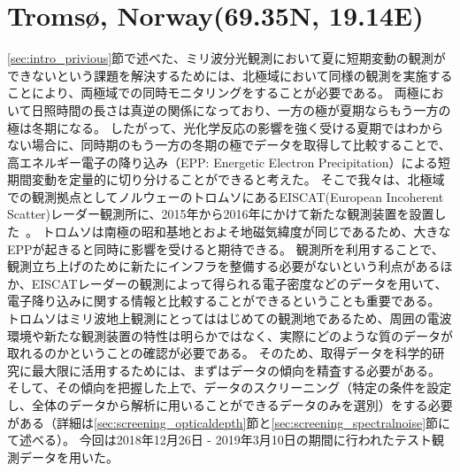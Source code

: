 \section{Troms\o , Norway(69.35\textdegree N, 19.14\textdegree E)}
\label{sec:mm_tromsoe}
\ref{sec:intro_privious}節で述べた、ミリ波分光観測において夏に短期変動の観測ができないという課題を解決するためには、北極域において同様の観測を実施することにより、両極域での同時モニタリングをすることが必要である。
両極において日照時間の長さは真逆の関係になっており、一方の極が夏期ならもう一方の極は冬期になる。
したがって、光化学反応の影響を強く受ける夏期ではわからない場合に、同時期のもう一方の冬期の極でデータを取得して比較することで、高エネルギー電子の降り込み（EPP: Energetic Electron Precipitation）による短期間変動を定量的に切り分けることができると考えた。
そこで我々は、北極域での観測拠点としてノルウェーのトロムソにあるEISCAT(European Incoherent Scatter)レーダー観測所に、2015年から2016年にかけて新たな観測装置を設置した~\cite{ito2017master}。
トロムソは南極の昭和基地とおよそ地磁気緯度が同じであるため、大きなEPPが起きると同時に影響を受けると期待できる。
観測所を利用することで、観測立ち上げのために新たにインフラを整備する必要がないという利点があるほか、EISCATレーダーの観測によって得られる電子密度などのデータを用いて、電子降り込みに関する情報と比較することができるということも重要である。
トロムソはミリ波地上観測にとってははじめての観測地であるため、周囲の電波環境や新たな観測装置の特性は明らかではなく、実際にどのような質のデータが取れるのかということの確認が必要である。
そのため、取得データを科学的研究に最大限に活用するためには、まずはデータの傾向を精査する必要がある。
そして、その傾向を把握した上で、データのスクリーニング（特定の条件を設定し、全体のデータから解析に用いることができるデータのみを選別）をする必要がある（詳細は\ref{sec:screening_opticaldepth}節と\ref{sec:screening_spectralnoise}節にて述べる）。
今回は2018年12月26日 - 2019年3月10日の期間に行われたテスト観測データを用いた。


